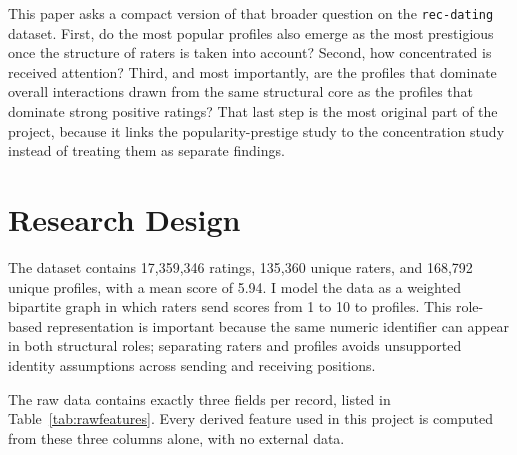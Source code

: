 \documentclass[10pt,twocolumn]{article}
\begin{document}
This paper asks a compact version of that broader question on the \texttt{rec-dating} dataset. First, do the most popular profiles also emerge as the most prestigious once the structure of raters is taken into account? Second, how concentrated is received attention? Third, and most importantly, are the profiles that dominate overall interactions drawn from the same structural core as the profiles that dominate strong positive ratings? That last step is the most original part of the project, because it links the popularity-prestige study to the concentration study instead of treating them as separate findings.

\section{Research Design}
The dataset contains 17,359,346 ratings, 135,360 unique raters, and 168,792 unique profiles, with a mean score of 5.94. I model the data as a weighted bipartite graph in which raters send scores from 1 to 10 to profiles. This role-based representation is important because the same numeric identifier can appear in both structural roles; separating raters and profiles avoids unsupported identity assumptions across sending and receiving positions.

The raw data contains exactly three fields per record, listed in Table~\ref{tab:rawfeatures}. Every derived feature used in this project is computed from these three columns alone, with no external data.
\end{document}
